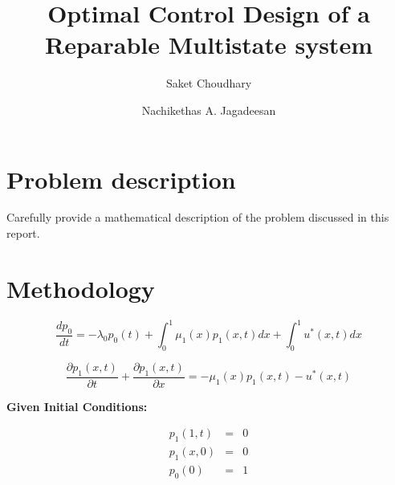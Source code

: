 \documentclass{ifacconf}
\begin{document}
\begin{frontmatter}


\title{
	Optimal Control Design of a Reparable Multistate system}%


\author[First]{Saket Choudhary} 
\author[Second]{Nachikethas A. Jagadeesan} 


\address[First]{University of Southern California, 
   LA, CA 90089 USA (e-mail: skchoudh@ usc.edu).}

\address[Second]{University of Southern California, 
   LA, CA 90089 USA (e-mail: nanantha@ usc.edu).}

\begin{abstract}                %

\end{abstract}

\begin{keyword}

\end{keyword}

\end{frontmatter}

\section{Problem description}
Carefully provide a mathematical description of the problem discussed in this report. 

\section{Methodology}
\label{sec:method}
\begin{equation}
\label{eq1}
\frac{dp_0}{dt} = -\lambda_0 p_0(t) + \int_0^1 \mu_1(x)p_1(x,t)dx + \int_0^1u^{*}(x,t)dx
\end{equation}

\begin{equation}
\label{eq2}
\frac{\partial p_1(x,t)}{\partial t} + \frac{\partial p_1(x,t)}{\partial x} = -\mu_1(x)p_1(x,t) - u^{*}(x,t)
\end{equation}


\textbf{Given Initial Conditions:}

\begin{eqnarray}
p_1(1,t) &=& 0\\
p_1(x,0) &=& 0\\
p_0(0) &=& 1
\end{eqnarray}
\end{document}
